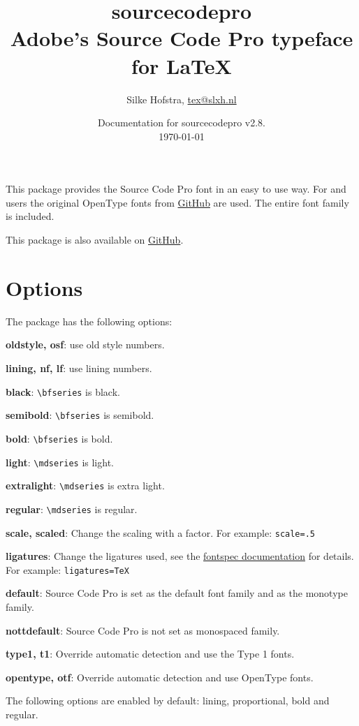 \documentclass[10pt,a4paper,english]{article}
\title{\bfseries
	\Huge sourcecodepro\\
	\Large Adobe's Source Code Pro typeface for \LaTeX
}
\author{Silke Hofstra, \href{mailto:tex@slxh.nl}{tex@slxh.nl}}
\date{Documentation for sourcecodepro v2.8.\\ \today}
\begin{document}
\maketitle
\begin{multicols}{2}
This package provides the Source Code Pro font in an easy to use way. For  and  users the original OpenType fonts from \href{https://github.com/adobe-fonts/source-code-pro}{GitHub} are used. The entire font family is included.

This package is also available on \href{https://github.com/silkeh/latex-sourcecodepro}{GitHub}.

\section{Options}
The package has the following options:
\begin{itemize*}
	\item \textbf{oldstyle, osf}:  use old style numbers.
	\item \textbf{lining, nf, lf}: use lining numbers.
	\item \textbf{black}:          \texttt{\textbackslash bfseries} is black.
	\item \textbf{semibold}:       \texttt{\textbackslash bfseries} is semibold.
	\item \textbf{bold}:           \texttt{\textbackslash bfseries} is bold.
	\item \textbf{light}:          \texttt{\textbackslash mdseries} is light.
	\item \textbf{extralight}:     \texttt{\textbackslash mdseries} is extra light.
	\item \textbf{regular}:        \texttt{\textbackslash mdseries} is regular.
	\item \textbf{scale, scaled}:  Change the scaling with a factor. For example: \texttt{scale=.5}
	\item \textbf{ligatures}:      Change the ligatures used,
                                   see the \href{http://mirrors.ctan.org/macros/latex/contrib/fontspec/fontspec.pdf}{fontspec documentation} for details.
								   For example: \texttt{ligatures=TeX}
	\item \textbf{default}:        Source Code Pro is set as the default font family and as the monotype family.
	\item \textbf{nottdefault}:    Source Code Pro is not set as monospaced family.
	\item \textbf{type1, t1}:      Override automatic detection and use the Type 1 fonts.
	\item \textbf{opentype, otf}:  Override automatic detection and use OpenType fonts.
\end{itemize*}
The following options are enabled by default: lining, proportional, bold and regular.


\end{multicols}
\end{document}

